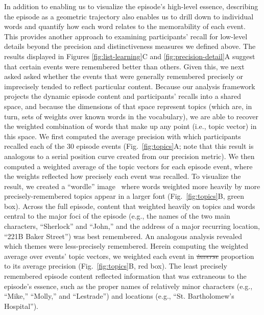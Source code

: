 \documentclass[10pt]{article}
\renewcommand{\includegraphics}[2][]{} %
\providecommand{\DIFaddtex}[1]{{\protect\color{blue}\uwave{#1}}} %
\providecommand{\DIFdeltex}[1]{{\protect\color{red}\sout{#1}}}                      %
\providecommand{\DIFaddbegin}{} %
\providecommand{\DIFaddend}{} %
\providecommand{\DIFdelbegin}{} %
\providecommand{\DIFdelend}{} %
\providecommand{\DIFadd}[1]{\texorpdfstring{\DIFaddtex{#1}}{#1}} %
\providecommand{\DIFdel}[1]{\texorpdfstring{\DIFdeltex{#1}}{}} %
\newcommand{\DIFscaledelfig}{0.5}
\newlength{\DIFdelgraphicswidth} %
\newlength{\DIFdelgraphicsheight} %
\newcommand{\DIFaddincludegraphics}[2][]{{\color{blue}\fbox{\DIFOincludegraphics[#1]{#2}}}} %
\newcommand{\DIFdelincludegraphics}[2][]{%
\sbox{\DIFdelgraphicsbox}{\DIFOincludegraphics[#1]{#2}}%
\settoboxwidth{\DIFdelgraphicswidth}{\DIFdelgraphicsbox} %
\settoboxtotalheight{\DIFdelgraphicsheight}{\DIFdelgraphicsbox} %
\scalebox{\DIFscaledelfig}{%
\parbox[b]{\DIFdelgraphicswidth}{\usebox{\DIFdelgraphicsbox}\\[-\baselineskip] \rule{\DIFdelgraphicswidth}{0em}}\llap{\resizebox{\DIFdelgraphicswidth}{\DIFdelgraphicsheight}{%
\setlength{\unitlength}{\DIFdelgraphicswidth}%
\begin{picture}(1,1)%
\thicklines\linethickness{2pt} %
{\color[rgb]{1,0,0}\put(0,0){\framebox(1,1){}}}%
{\color[rgb]{1,0,0}\put(0,0){\line( 1,1){1}}}%
{\color[rgb]{1,0,0}\put(0,1){\line(1,-1){1}}}%
\end{picture}%
}\hspace*{3pt}}} %
} %
\DeclareRobustCommand{\DIFaddbegin}{\DIFOaddbegin \let\includegraphics\DIFaddincludegraphics} %
\DeclareRobustCommand{\DIFaddend}{\DIFOaddend \let\includegraphics\DIFOincludegraphics} %
\DeclareRobustCommand{\DIFdelbegin}{\DIFOdelbegin \let\includegraphics\DIFdelincludegraphics} %
\DeclareRobustCommand{\DIFdelend}{\DIFOaddend \let\includegraphics\DIFOincludegraphics} %
\begin{document}
In addition to enabling us to visualize the episode's high-level essence, describing the episode as a geometric trajectory also enables us to drill down to individual words and quantify how each word relates to the memorability of each event.  This provides another approach to examining participants' recall for low-level details beyond the precision and distinctiveness measures we defined above.  The results displayed in Figures \ref{fig:list-learning}C and \ref{fig:precision-detail}A suggest that certain events were remembered better than others.  Given this, we next asked asked whether the events that were generally remembered precisely or imprecisely tended to reflect particular content.  Because our analysis framework projects the dynamic episode content and participants' recalls into a shared space, and because the dimensions of that space represent topics (which are, in turn, sets of weights over known words in the vocabulary), we are able to recover the weighted combination of words that make up any point (i.e., topic vector) in this space.  We first computed the average precision with which participants recalled each of the 30 episode events (Fig.~\ref{fig:topics}A; note that this result is analogous to a serial position curve created from our precision metric).  We then computed a weighted average of the topic vectors for each episode event, where the weights reflected how precisely each event was recalled.  To visualize the result, we created a ``wordle'' image~\citep{MuelEtal18} where words weighted more heavily by more precisely-remembered topics appear in a larger font (Fig.~\ref{fig:topics}B, green box).  Across the full episode, content that weighted heavily on topics and words central to the major foci of the episode (e.g., the names of the two main characters, ``Sherlock'' and ``John,'' and the address of a major recurring location, ``221B Baker Street'') was best remembered.  An analogous analysis revealed which themes were less-precisely remembered.  Here\DIFaddbegin \DIFadd{, }\DIFaddend in computing the weighted average over events' topic vectors, we weighted each event in \DIFdelbegin \textit{\DIFdel{inverse}} %
\DIFdelend \DIFaddbegin \DIFadd{inverse }\DIFaddend proportion to its average precision (Fig.~\ref{fig:topics}B, red box).  The least precisely remembered episode content reflected information that was extraneous to the episode's essence, such as the proper names of relatively minor characters (e.g., ``Mike,'' ``Molly,'' and ``Lestrade'') and locations (e.g., ``St. Bartholomew's Hospital'').
\end{document}
